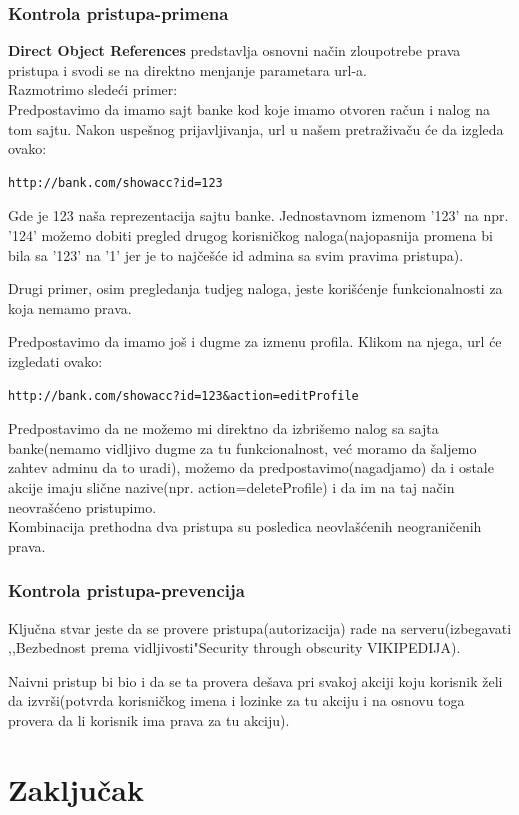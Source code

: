 \documentclass[a4paper]{article}
\begin{document}
\subsubsection{Kontrola pristupa-primena}
\textbf{Direct Object References} predstavlja osnovni na\v{c}in zloupotrebe prava pristupa i svodi se na direktno menjanje parametara url-a.\\
Razmotrimo slede\'{c}i primer:\\
Predpostavimo da imamo sajt banke kod koje imamo otvoren ra\v{c}un i nalog na tom sajtu. Nakon uspe\v{s}nog prijavljivanja, url u na\v{s}em pretra\v{z}iva\v{c}u \'{c}e da izgleda ovako:\\
\begin{lstlisting}
http://bank.com/showacc?id=123
\end{lstlisting}
Gde je 123 na\v{s}a reprezentacija sajtu banke. Jednostavnom izmenom '123' na npr. '124' mo\v{z}emo dobiti pregled drugog korisni\v{c}kog naloga(najopasnija promena bi bila sa '123' na '1' jer je to naj\v{c}e\v{s}\'{c}e id admina sa svim pravima pristupa).

Drugi primer, osim pregledanja tudjeg naloga, jeste kori\v{s}\'{c}enje funkcionalnosti za koja nemamo prava.

Predpostavimo da imamo jo\v{s} i dugme za izmenu profila. Klikom na njega, url \'{c}e izgledati ovako:\\
\begin{lstlisting}
http://bank.com/showacc?id=123&action=editProfile
\end{lstlisting}

Predpostavimo da ne mo\v{z}emo mi direktno da izbri\v{s}emo nalog sa sajta banke(nemamo vidljivo dugme za tu funkcionalnost, ve\'{c} moramo da \v{s}aljemo zahtev adminu da to uradi), mo\v{z}emo da predpostavimo(nagadjamo) da i ostale akcije imaju sli\v{c}ne nazive(npr. action=deleteProfile) i da im na taj na\v{c}in neovra\v{s}\'{c}eno pristupimo.\\

Kombinacija prethodna dva pristupa su posledica neovla\v{s}\'{c}enih neograni\v{c}enih prava.
\subsubsection{Kontrola pristupa-prevencija}
Klju\v{c}na stvar jeste da se provere pristupa(autorizacija) rade na serveru(izbegavati ,,Bezbednost prema vidljivosti"Security through obscurity VIKIPEDIJA). 

Naivni pristup bi bio i da se ta provera de\v{s}ava pri svakoj akciji koju korisnik \v{z}eli da izvr\v{s}i(potvrda korisni\v{c}kog imena i lozinke za tu akciju i na osnovu toga provera da li korisnik ima prava za tu akciju).
\section{Zaključak}

\appendix


\end{document}
